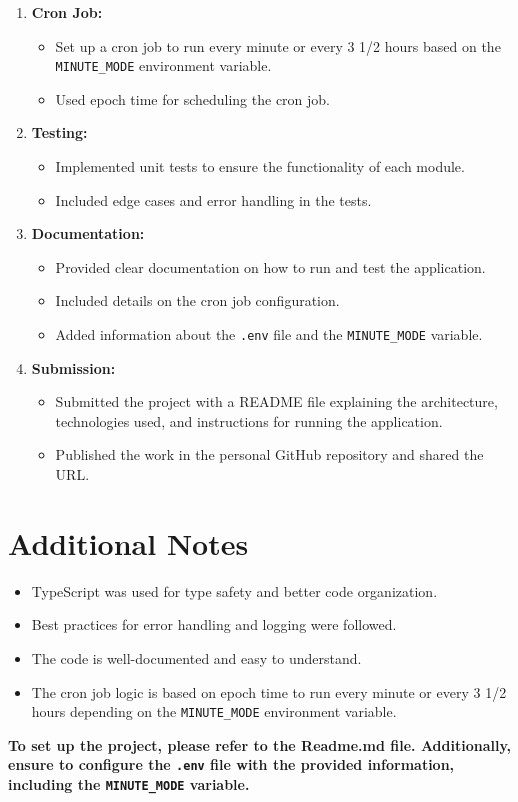 \documentclass{article}
\begin{document}
\begin{enumerate}[label=\arabic*.]
		\item \textbf{Cron Job:}
		\begin{itemize}[label=-]
			\item Set up a cron job to run every minute or every 3 1/2 hours based on the \texttt{MINUTE\_MODE} environment variable.
			\item Used epoch time for scheduling the cron job.
		\end{itemize}
		
		\item \textbf{Testing:}
		\begin{itemize}[label=-]
			\item Implemented unit tests to ensure the functionality of each module.
			\item Included edge cases and error handling in the tests.
		\end{itemize}
		
		\item \textbf{Documentation:}
		\begin{itemize}[label=-]
			\item Provided clear documentation on how to run and test the application.
			\item Included details on the cron job configuration.
			\item Added information about the \texttt{.env} file and the \texttt{MINUTE\_MODE} variable.
		\end{itemize}
		
		\item \textbf{Submission:}
		\begin{itemize}[label=-]
			\item Submitted the project with a README file explaining the architecture, technologies used, and instructions for running the application.
			\item Published the work in the personal GitHub repository and shared the URL.
		\end{itemize}
	
	\end{enumerate}
	
	\section*{Additional Notes}
	\begin{itemize}[label=-]
		\item TypeScript was used for type safety and better code organization.
		\item Best practices for error handling and logging were followed.
		\item The code is well-documented and easy to understand.
		\item The cron job logic is based on epoch time to run every minute or every 3 1/2 hours depending on the \texttt{MINUTE\_MODE} environment variable.
	\end{itemize}
	
	\textbf{To set up the project, please refer to the Readme.md file. Additionally, ensure to configure the \texttt{.env} file with the provided information, including the \texttt{MINUTE\_MODE} variable.}
	
\end{document}
